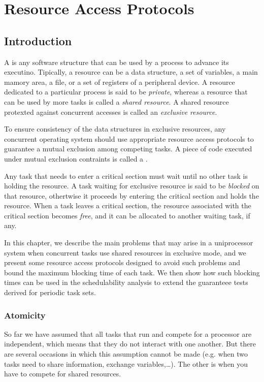 \chapter{Resource Access Protocols}
\section{Introduction}
A  is any software structure that can be used by a process to advance its executino. Tipically,  a resource can be a data structure, a set of variables, a main mamory area, a file, or a set of registers of a peripheral device. A resource dedicated to a particular process is said to be \textit{private}, whereas a resource that can be used by more tasks is called a \textit{shared resource}. A shared resource protexted against concurrent accesses is called an \textit{exclusive resource}.

To ensure consistency of the data structures in exclusive resources, any concurrent operating system should use appropriate resource access protocols to guarantee a mutual exclusion among competing tasks. A piece of code executed under mutual exclusion contraints is called a .

Any task that needs to enter a critical section must wait until no other task is holding the resource. A task waiting for exclusive resource is said to be \textit{blocked} on that resource, othertwise it proceeds by entering the critical section and holds the resource. When a task leaves a critical section, the resource associated with the critical section becomes \textit{free}, and it can be allocated to another waiting task, if any.

In this chapter, we describe the main problems that may arise in a uniprocessor system when concurrent tasks use shared resources in exclusive mode, and we present some resource access protocols designed to avoid such problems and bound the maximum blocking time of each task. We then show how such blocking times can be used in the schedulability analysis to extend the guaranteee tests derived for periodic task sets.

\subsection{Atomicity}
So far we have assumed that all tasks that run and compete for a processor are independent, which means that they do not interact with one another. But there are several occasions in which this assumption cannot be made (e.g. when two tasks need to share information, exchange variables,\dots).
The other is when you have to compete for shared resources.

